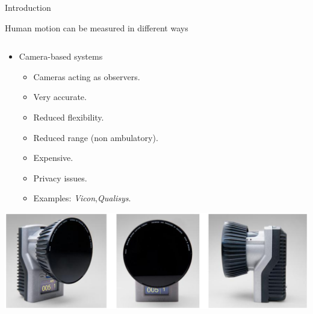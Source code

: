\documentclass[10pt,aspectratio=1610]{beamer}
\begin{document}
\begin{frame}{Introduction}{}

\begin{block}{Human motion can be measured in different ways}
\begin{columns}
    \begin{column}{.5\linewidth}
	    \begin{itemize}
	    	\item Camera-based systems
	    	\begin{itemize}
	    		\item Cameras acting as observers.
	    		\item Very accurate.
	    		\item Reduced flexibility.
	    		\item Reduced range (non ambulatory).
	    		\item Expensive.
	    		\item Privacy issues.
	    		\item Examples: \textit{Vicon},\textit{Qualisys}.
	    	\end{itemize}
	    \end{itemize}
	    \vspace{0.6cm}
	    \includegraphics[width=1\textwidth]{AAUgraphics/bla.eps}	
	    \vspace{0.3cm}
    \end{column}
    	     

\end{columns}
\end{block}
\end{frame}
\end{document}
